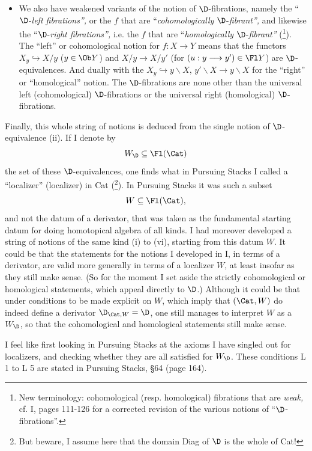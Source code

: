 \begin{itemize}
\item[(vi)] We also have weakened variants of the notion of $\D$-fibrations, namely the ``$\D$-\textit{left fibrations'',} or the $f$ that are ``\textit{cohomologically} $\D$-\textit{fibrant'',} and likewise the ``$\D$-\textit{right fibrations'',} i.e. the $f$ that are ``\textit{homologically} $\D$-\textit{fibrant''} (\footnote{New terminology: cohomological (resp. homological) fibrations that are \textit{weak,} cf. I, pages 111-126 for a corrected revision of the various notions of ``$\D$-fibrations''.}). The ``left''
or cohomological notion for $f : X \longrightarrow Y$ means that the functors $X_y \hookrightarrow X/y$ ($y \in \Ob Y$) and $X/y \longrightarrow X/y'$ (for $(u : y \longrightarrow y') \in \Fl Y$) are $\D$-equivalences. And dually with the $X_y \hookrightarrow y\backslash X$, $y'\backslash X \longrightarrow y\backslash X$ for the ``right'' or ``homological'' notion. The $\D$-fibrations are none other than the universal left (cohomological) $\D$-fibrations or the universal right (homological) $\D$-fibrations.
\end{itemize}

Finally, this whole string of notions is deduced from the single notion of $\D$-equivalence (ii). If I denote by
\[
W_{\D} \subseteq \Fl(\Cat)
\]
the set of these $\D$-equivalences, one finds what in Pursuing Stacks I called a ``localizer'' (localizer) in Cat (\footnote{But beware, I assume here that the domain Diag of $\D$ is the whole of Cat!}). In Pursuing Stacks it was such a subset
\[
W \subseteq \Fl(\Cat),
\]
and not the datum of a derivator, that
was taken as the fundamental starting datum for doing homotopical algebra of all kinds. I had moreover developed a string of notions of the same kind (i) to (vi), starting from this datum $W$. It could be that the statements for the notions I developed in I, in terms of a derivator, are valid more generally in terms of a localizer $W$, at least insofar as they still make sense. (So for the moment I set aside the strictly cohomological or homological statements, which appeal directly to $\D$.) Although it could be that under conditions to be made explicit on $W$, which imply that $(\Cat, W)$ do indeed define a derivator $\D_{\Cat,W} = \D$, one still manages to interpret $W$ as a $W_{\D}$, so that the cohomological and homological statements still make sense.

I feel like first looking in Pursuing Stacks at the axioms I have singled out for localizers, and checking whether they are all satisfied for
$W_{\D}$. These conditions L 1 to L 5 are stated in Pursuing Stacks, §64 (page 164).

